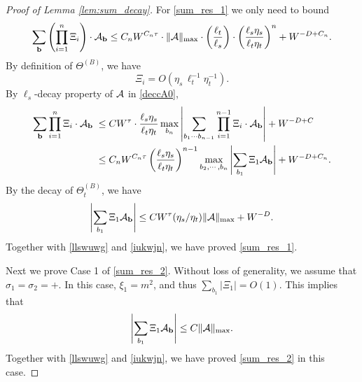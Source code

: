 \documentclass[10pt,reqno]{article}
\theoremstyle{plain} %
\theoremstyle{remark}
\numberwithin{equation}{section}
\begin{document}
\begin{proof}[Proof of Lemma \ref{lem:sum_decay}]
For \eqref{sum_res_1} we only need to bound
\begin{align}
    \sum_{\textbf{b}}  \left(\prod_{i=1}^n  \Xi_i \right) \cdot 
{\cal A}_{\textbf{b}} \le C_n W^{C_n \tau} \cdot\|\mathcal{A}\|_{\max } \cdot\left(\frac{\ell_t}{\ell_s}\right) \cdot\left(\frac{\ell_s \eta_s}{\ell_t \eta_t}\right)^n+W^{-D+C_n}.
\end{align}
By definition of $\Theta^{(B)}$, we have 
$$
\Xi_i=O\left( \eta_s \,\ell_t^{-1}\eta_t^{-1}\right).
$$
By  $\ell_s$-decay property of $\cal A$ in \eqref{deccA0}, 
\begin{align}\label{llswuwg}
  \sum_{\textbf{b}}   \prod_{i=1}^n  \Xi_i  \cdot 
{\cal A}_{\textbf{b}}
\;\le\; & C W^{\tau}\cdot \frac{\ell_s \eta_s}{\ell_t \eta_t} \max_{b_n}
\left|\sum_{b_1\cdots b_{n-1}} \prod_{i=1}^{n-1}  \Xi_i  \cdot 
{\cal A}_{\textbf{b}}\right|+W^{-D+C}
\\\nonumber
\;\le\; & C_n W^{C_n\tau} \left(\frac{\ell_s \eta_s}{\ell_t \eta_t} \right)^{n-1} \max_{b_2,\cdots, b_n}  \left|\sum_{b_1 }\Xi_1 {\cal A}_{\textbf{b}}\right|+W^{-D+C_n}. 
\end{align}
By the decay of $\Theta^{(B)}_t$, we have 
\begin{align}\label{tyzcsq}
  \left|\sum_{b_1 }\Xi_1 {\cal A}_{\textbf{b}}\right|\le CW^\tau (\eta_s/\eta_t)\|{\cal A}\|_{\max}+W^{-D}  .
\end{align}
 Together with \eqref{llswuwg} and \eqref{iukwjn}, we have proved  \eqref{sum_res_1}. 

Next we prove Case 1 of \eqref{sum_res_2}. Without loss of generality, we assume that $\sigma_1=\sigma_2=+$. In this case, $\xi_1=m^2$, and thus  $\sum_{b_1}|\Xi_1|=O(1)$. This implies that 
$$
\left|\sum_{b_1 }\Xi_1 {\cal A}_{\textbf{b}}\right|\le  C\|{\cal A}\|_{\max} .
$$
Together with \eqref{llswuwg} and \eqref{iukwjn}, we have proved  \eqref{sum_res_2} in this case. 



\end{proof}
\end{document}
